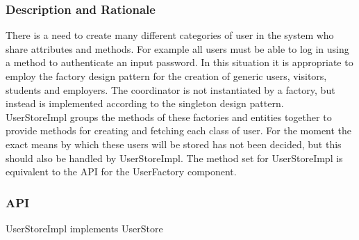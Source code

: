 \documentclass{l3deliverable}
\begin{document}
\subsubsection{Description and Rationale}
There is a need to create many different categories of user in the system who share attributes and methods. For example all users must be able to log in using a method
to authenticate an input password. In this situation it is appropriate to employ the factory design pattern for the creation of generic users, visitors, students and employers.
The coordinator is not instantiated by a factory, but instead is implemented according to the singleton design pattern. \\
UserStoreImpl groups the methods of these factories and entities together to provide methods for creating and fetching each class of user. For the moment the exact 
means by which these users will be stored has not been decided, but this should also be handled by UserStoreImpl. The method set for UserStoreImpl is equivalent to the API for 
the UserFactory component.
\subsubsection{API}
UserStoreImpl implements UserStore
\end{document}
